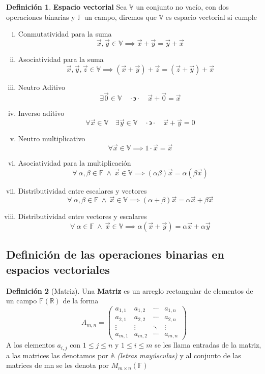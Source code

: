 \documentclass[letterpaper]{article}
\newcommand{\V}{\mathds{V}}
\newcommand{\F}{\mathds{F}}
\newcommand{\tq}{ \quad \cdot  \backepsilon \cdot \quad }
\newcommand{\R}{\mathds{R}}
\renewcommand{\*}{\cdot}
\theoremstyle{definition}
\newtheorem{definition}{Definición}[section]
\begin{document}
	\begin{definition}
		\textbf{Espacio vectorial} Sea $ \V $ un conjunto  no vacío, con dos operaciones binarias y $ \F $ un campo, diremos que $ \V $ es espacio vectorial si cumple
		\begin{enumerate}[(i)]
			\item Conmutatividad para la suma
			\[ \vec{x}, \vec{y} \in \V \implies \vec{x} + \vec{y} = \vec{y} + \vec{x} \]
			\item Asociatividad para la suma
			\[ \vec{x},\vec{y},\vec{z} \in \V \implies (\vec{x} + \vec{y}) + \vec{z} = ( \vec{z} + \vec{y}) + \vec{x}  \]
			\item Neutro Aditivo
			\[ \exists \vec{0}\in \V \tq \vec{x} + \vec{0} = \vec{x} \]
			\item Inverso aditivo 
			\[\forall \vec{x} \in \V \quad \exists \vec{y} \in \V \tq \vec{x} + \vec{y} = 0 \]
			\item Neutro multiplicativo
			\[\forall \vec{x} \in \V \implies 1\* \vec{x} = \vec{x} \]
			\item Asociatividad para la multiplicación
			\[ \forall \ \alpha, \beta \in \F \ \land \ \vec{x} \in \V \implies (\alpha \beta)\vec{x} = \alpha(\beta \vec{x}) \]
			\item Distributividad entre escalares y vectores
			\[  \forall \ \alpha, \beta \in \F \ \land \ \vec{x} \in \V \implies (\alpha + \beta)\vec{x} = \alpha \vec{x} + \beta \vec{x} \]
			\item Distributividad entre vectores y escalares
			\[  \forall \ \alpha \in \F \ \land \ \vec{x} \in \V \implies \alpha (\vec{x} + \vec{y}) = \alpha \vec{x} + \alpha \vec{y} \]	
		\end{enumerate}
	\end{definition}
	\subsection{Definición de las operaciones binarias en espacios vectoriales}

	
		\begin{definition}[Matriz]
		Una \textbf{Matriz} es un arreglo rectangular de elementos de un campo $ \F(\R) $ de la forma
		\begin{equation*}
		A_{m,n} = 
		\begin{pmatrix}
		a_{1,1} & a_{1,2} & \cdots & a_{1,n} \\
		a_{2,1} & a_{2,2} & \cdots & a_{2,n} \\
		\vdots  & \vdots  & \ddots & \vdots  \\
		a_{m,1} & a_{m,2} & \cdots & a_{m,n} 
		\end{pmatrix}
		\end{equation*}
		A los elementos $ a_{i,j} $ con $ 1 \leq j \leq n $ y $ 1 \leq i \leq m $ se les llama entradas de la matriz, a las matrices las denotamos por $ \mathds{A} $ 				\textit{(letras mayúsculas)} y al conjunto de las matrices de mn se les denota por $ M_{m\times n}(\F) $
		\end{definition}

		
	
	
\end{document}
